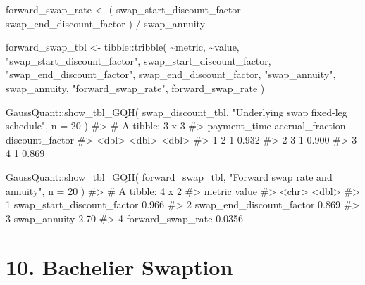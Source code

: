 \documentclass[
  letterpaper,
  DIV=11,
  numbers=noendperiod]{scrreprt}
\newenvironment{Shaded}{\begin{snugshade}}{\end{snugshade}}
\newcommand{\AttributeTok}[1]{\textcolor[rgb]{0.40,0.45,0.13}{#1}}
\newcommand{\CommentTok}[1]{\textcolor[rgb]{0.37,0.37,0.37}{#1}}
\newcommand{\DecValTok}[1]{\textcolor[rgb]{0.68,0.00,0.00}{#1}}
\newcommand{\FunctionTok}[1]{\textcolor[rgb]{0.28,0.35,0.67}{#1}}
\newcommand{\NormalTok}[1]{\textcolor[rgb]{0.00,0.23,0.31}{#1}}
\newcommand{\OtherTok}[1]{\textcolor[rgb]{0.00,0.23,0.31}{#1}}
\newcommand{\SpecialCharTok}[1]{\textcolor[rgb]{0.37,0.37,0.37}{#1}}
\newcommand{\StringTok}[1]{\textcolor[rgb]{0.13,0.47,0.30}{#1}}
\begin{document}
\begin{Shaded}
\begin{Highlighting}[]
\NormalTok{forward\_swap\_rate }\OtherTok{\textless{}{-}}\NormalTok{ (}
\NormalTok{  swap\_start\_discount\_factor }\SpecialCharTok{{-}}
\NormalTok{    swap\_end\_discount\_factor}
\NormalTok{) }\SpecialCharTok{/}\NormalTok{ swap\_annuity}

\NormalTok{forward\_swap\_tbl }\OtherTok{\textless{}{-}}\NormalTok{ tibble}\SpecialCharTok{::}\FunctionTok{tribble}\NormalTok{(}
  \SpecialCharTok{\textasciitilde{}}\NormalTok{metric,                       }\SpecialCharTok{\textasciitilde{}}\NormalTok{value,}
  \StringTok{"swap\_start\_discount\_factor"}\NormalTok{,   swap\_start\_discount\_factor,}
  \StringTok{"swap\_end\_discount\_factor"}\NormalTok{,     swap\_end\_discount\_factor,}
  \StringTok{"swap\_annuity"}\NormalTok{,                 swap\_annuity,}
  \StringTok{"forward\_swap\_rate"}\NormalTok{,            forward\_swap\_rate}
\NormalTok{)}

\NormalTok{GaussQuant}\SpecialCharTok{::}\FunctionTok{show\_tbl\_GQH}\NormalTok{(}
\NormalTok{  swap\_discount\_tbl,}
  \StringTok{"Underlying swap fixed{-}leg schedule"}\NormalTok{,}
  \AttributeTok{n =} \DecValTok{20}
\NormalTok{)}
\CommentTok{\#\textgreater{} \# A tibble: 3 x 3}
\CommentTok{\#\textgreater{}   payment\_time accrual\_fraction discount\_factor}
\CommentTok{\#\textgreater{}          \textless{}dbl\textgreater{}            \textless{}dbl\textgreater{}           \textless{}dbl\textgreater{}}
\CommentTok{\#\textgreater{} 1            2                1           0.932}
\CommentTok{\#\textgreater{} 2            3                1           0.900}
\CommentTok{\#\textgreater{} 3            4                1           0.869}

\NormalTok{GaussQuant}\SpecialCharTok{::}\FunctionTok{show\_tbl\_GQH}\NormalTok{(}
\NormalTok{  forward\_swap\_tbl,}
  \StringTok{"Forward swap rate and annuity"}\NormalTok{,}
  \AttributeTok{n =} \DecValTok{20}
\NormalTok{)}
\CommentTok{\#\textgreater{} \# A tibble: 4 x 2}
\CommentTok{\#\textgreater{}   metric                      value}
\CommentTok{\#\textgreater{}   \textless{}chr\textgreater{}                       \textless{}dbl\textgreater{}}
\CommentTok{\#\textgreater{} 1 swap\_start\_discount\_factor 0.966 }
\CommentTok{\#\textgreater{} 2 swap\_end\_discount\_factor   0.869 }
\CommentTok{\#\textgreater{} 3 swap\_annuity               2.70  }
\CommentTok{\#\textgreater{} 4 forward\_swap\_rate          0.0356}
\end{Highlighting}
\end{Shaded}

\section{10. Bachelier Swaption}\label{bachelier-swaption}
\end{document}
